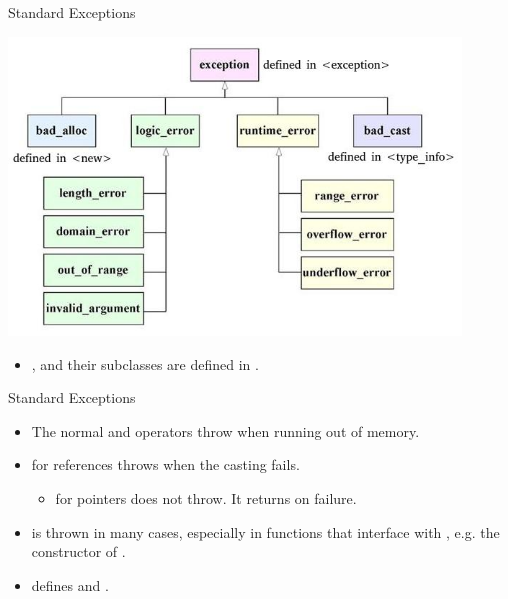 \documentclass{beamer}
\begin{document}
\begin{frame}{Standard Exceptions}
    \begin{center}
        \includegraphics[width=0.9\textwidth]{img/ExceptionClasses.jpg}
    \end{center}
    \begin{itemize}
        \item {},  and their subclasses are defined in .
    \end{itemize}
\end{frame}

\begin{frame}{Standard Exceptions}
    \begin{itemize}
        \item The normal  and \ttt{[]} operators throw  when running out of memory.
        \item {} for references throws  when the casting fails.
        \begin{itemize}
            \item {} for pointers does not throw. It returns  on failure.
        \end{itemize}
        \pause
        \item {} is thrown in many cases, especially in functions that interface with , e.g. the constructor of .
        \item {} defines  and .
    \end{itemize}
\end{frame}
\end{document}
